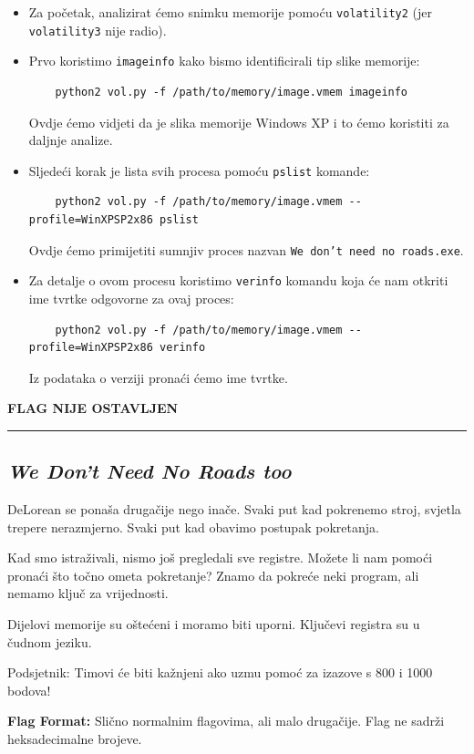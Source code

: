 \documentclass{article}
\begin{document}
\begin{itemize}
    \item Za početak, analizirat ćemo snimku memorije pomoću \texttt{volatility2} (jer \texttt{volatility3} nije radio).
    \item Prvo koristimo \texttt{imageinfo} kako bismo identificirali tip slike memorije:
    \begin{verbatim}
    python2 vol.py -f /path/to/memory/image.vmem imageinfo
    \end{verbatim}
    Ovdje ćemo vidjeti da je slika memorije Windows XP i to ćemo koristiti za daljnje analize.
    
    \item Sljedeći korak je lista svih procesa pomoću \texttt{pslist} komande:
    \begin{verbatim}
    python2 vol.py -f /path/to/memory/image.vmem --profile=WinXPSP2x86 pslist
    \end{verbatim}
    Ovdje ćemo primijetiti sumnjiv proces nazvan \texttt{We don't need no roads.exe}.
    
    \item Za detalje o ovom procesu koristimo \texttt{verinfo} komandu koja će nam otkriti ime tvrtke odgovorne za ovaj proces:
    \begin{verbatim}
    python2 vol.py -f /path/to/memory/image.vmem --profile=WinXPSP2x86 verinfo
    \end{verbatim}
    Iz podataka o verziji pronaći ćemo ime tvrtke.
\end{itemize}

\begin{center}
    \textbf{FLAG NIJE OSTAVLJEN}
\end{center}

\noindent\rule{\textwidth}{0.4pt}

\subsection{\textit{We Don't Need No Roads too}}
\begin{tcolorbox}[
    colback=gray!5,  %
    colframe=gray!75,  %
    title=\textbf{Zadatak}]
    DeLorean se ponaša drugačije nego inače. Svaki put kad pokrenemo stroj, svjetla trepere nerazmjerno. Svaki put kad obavimo postupak pokretanja.

    Kad smo istraživali, nismo još pregledali sve registre. Možete li nam pomoći pronaći što točno ometa pokretanje? Znamo da pokreće neki program, ali nemamo ključ za vrijednosti.

    Dijelovi memorije su oštećeni i moramo biti uporni. Ključevi registra su u čudnom jeziku.

    Podsjetnik: Timovi će biti kažnjeni ako uzmu pomoć za izazove s 800 i 1000 bodova!

    \textbf{Flag Format:} Slično normalnim flagovima, ali malo drugačije. Flag ne sadrži heksadecimalne brojeve.

\end{tcolorbox}
\end{document}
